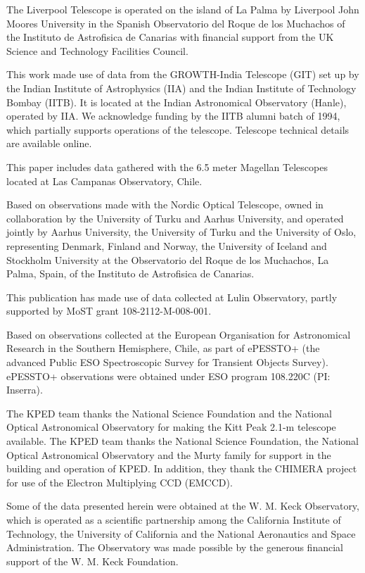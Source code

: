 \documentclass{nature_plusfigure}
\begin{document}
\begin{addendum}
The Liverpool Telescope is operated on the island of La Palma by Liverpool John Moores University in the Spanish Observatorio del Roque de los Muchachos of the Instituto de Astrofisica de Canarias with financial support from the UK Science and Technology Facilities Council.

This work made use of data from the GROWTH-India Telescope (GIT) set up by the Indian Institute of Astrophysics (IIA) and the Indian Institute of Technology Bombay (IITB). It is located at the Indian Astronomical Observatory (Hanle), operated by IIA. We acknowledge funding by the IITB alumni batch of 1994, which partially supports operations of the telescope. Telescope technical details are available online.\cite{growth_india}

This paper includes data gathered with the 6.5 meter Magellan Telescopes located at Las Campanas Observatory, Chile.

Based on observations made with the Nordic Optical Telescope, owned in collaboration by the University of Turku and Aarhus University, and operated jointly by Aarhus University, the University of Turku and the University of Oslo, representing Denmark, Finland and Norway, the University of Iceland and Stockholm University at the Observatorio del Roque de los Muchachos, La Palma, Spain, of the Instituto de Astrofisica de Canarias.

This publication has made use of data collected at Lulin Observatory, partly supported by MoST grant 108-2112-M-008-001.

Based on observations collected at the European Organisation for Astronomical Research in the Southern Hemisphere, Chile, as part of ePESSTO+ (the advanced Public ESO Spectroscopic Survey for Transient Objects Survey).
ePESSTO+ observations were obtained under ESO program 108.220C (PI: Inserra).

The KPED team thanks the National Science Foundation and the National Optical Astronomical Observatory for making the Kitt Peak 2.1-m telescope available. The KPED team thanks the National Science Foundation, the National Optical Astronomical Observatory and the Murty family for support in the building and operation of KPED. In addition, they thank the CHIMERA project for use of the Electron Multiplying CCD (EMCCD).

Some of the data presented herein were obtained at the W. M. Keck Observatory, which is operated as a scientific partnership among the California Institute of Technology, the University of California and the National Aeronautics and Space Administration. The Observatory was made possible by the generous financial support of the W. M. Keck Foundation.


\end{addendum}
\end{document}
